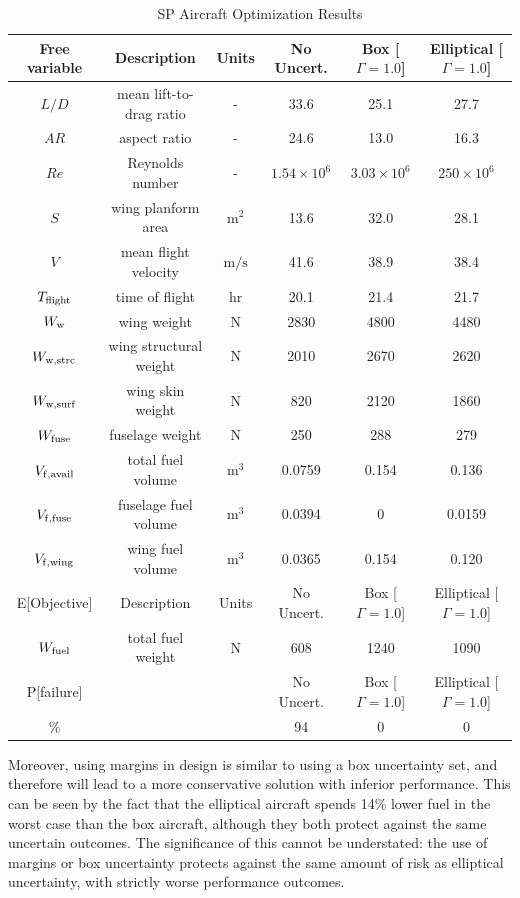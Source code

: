 \begin{table}[!h]
\begin{center}
\caption{\label{tab:results} SP Aircraft Optimization Results}
\begin{tabular}{c c c c c c}
\hline
Free variable & Description & Units & No Uncert. & Box [$\Gamma = 1.0$] & Elliptical [$\Gamma = 1.0$] \\
\hline
$L/D$ & mean lift-to-drag ratio & - & 33.6 & 25.1 & 27.7 \\
$AR$ & aspect ratio & - & 24.6 & 13.0 & 16.3 \\
$Re$ & Reynolds number & - & $1.54 \times 10^6$ & $3.03\times 10^6$ & $250 \times 10^6$ \\
$S$ & wing planform area &$\mathrm{m^2}$ & 13.6 & 32.0 & 28.1 \\
$V$ & mean flight velocity &$\mathrm{m/s}$ & 41.6 & 38.9 & 38.4 \\
$T_{\rm{flight}}$ & time of flight & $\mathrm{hr}$ & 20.1 & 21.4 & 21.7 \\
$W_{\rm{w}}$ & wing weight & $\mathrm{N}$ & 2830 & 4800 & 4480 \\
$W_{\rm{w,strc}}$ & wing structural weight &$\mathrm{N}$ & 2010 & 2670 & 2620 \\
$W_{\rm{w,surf}}$ & wing skin weight &$\mathrm{N}$ & 820 & 2120 & 1860 \\
$W_{\rm{fuse}}$ & fuselage weight &$\mathrm{N}$ & 250 & 288 & 279 \\
$V_{\rm{f,avail}}$ & total fuel volume & $\mathrm{m^3}$ & 0.0759 & 0.154 & 0.136 \\
$V_{\rm{f,fuse}}$ & fuselage fuel volume & $\mathrm{m^3}$ & 0.0394 & 0 & 0.0159 \\
$V_{\rm{f,wing}}$ & wing fuel volume &$\mathrm{m^3}$ & 0.0365 & 0.154 & 0.120    \\
\hline
E[Objective] & Description & Units & No Uncert. & Box [$\Gamma = 1.0$] & Elliptical [$\Gamma = 1.0$] \\
\hline
$W_{\rm{fuel}}$ & total fuel weight & $\mathrm{N}$ & 608 & 1240 & 1090 \\
\hline
P[failure] & & & No Uncert. & Box [$\Gamma = 1.0$] & Elliptical [$\Gamma = 1.0$] \\
\hline
\% & & & 94 & 0 & 0\\
\hline
\end{tabular}
\end{center}
\end{table}

Moreover, using margins in design is similar to using a box uncertainty set, and therefore will lead
to a more conservative solution with inferior performance. This can be seen by the fact that
the elliptical aircraft spends 14\% lower fuel in the worst case
than the box aircraft, although they both protect against the same uncertain outcomes.
The significance of this cannot be understated: the use of margins or box uncertainty protects
against the same amount of risk as elliptical uncertainty, with strictly worse performance outcomes.

